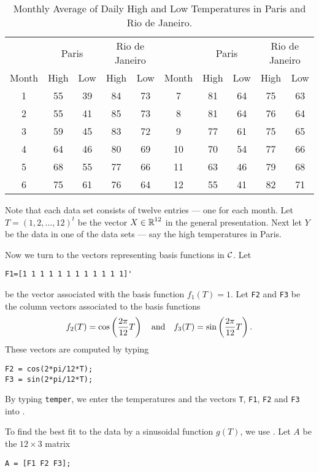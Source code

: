 \documentclass{ximera}
\begin{document}
\begin{table*}[htb]
\begin{center}
\begin{tabular}{|c||c|c||c|c|||c||c|c||c|c|}
\hline
  & \multicolumn{2}{c||}{Paris} & \multicolumn{2}{c|||}{Rio de Janeiro} &
  & \multicolumn{2}{c||}{Paris} & \multicolumn{2}{c|}{Rio de Janeiro}\\
Month & High & Low & High & Low & Month & High & Low & High & Low\\
\hline
  1 & 55 & 39 & 84 & 73 &   7 & 81 & 64 & 75 & 63 \\
  2 & 55 & 41 & 85 & 73 &   8 & 81 & 64 & 76 & 64 \\
  3 & 59 & 45 & 83 & 72 &   9 & 77 & 61 & 75 & 65 \\
  4 & 64 & 46 & 80 & 69 &  10 & 70 & 54 & 77 & 66 \\
  5 & 68 & 55 & 77 & 66 &  11 & 63 & 46 & 79 & 68 \\
  6 & 75 & 61 & 76 & 64 &  12 & 55 & 41 & 82 & 71 \\
\hline
\end{tabular}
\caption{Monthly Average of Daily High and Low Temperatures in Paris and Rio de
Janeiro.}
\label{T:parrio}
\end{center}
\end{table*}

Note that each data set consists of twelve entries --- one for each month.
Let $T=(1,2,\ldots,12)^t$ be the vector $X\in\mbox{$\Bbb{R}$}^{12}$ in the general
presentation.  Next let $Y$ be the data in one of the data sets --- say the
high temperatures in Paris.

Now we turn to the vectors representing basis functions in ${\cal C}$.
Let
\begin{verbatim}
F1=[1 1 1 1 1 1 1 1 1 1 1 1]'
\end{verbatim}
be the vector associated with the basis function $f_1(T)=1$. Let  {\tt F2}
and {\tt F3} be the column vectors associated to the basis functions
\[
f_2(T) = \cos\left(\frac{2\pi}{12} T\right) \quad\mbox{and}\quad
f_3(T) = \sin\left(\frac{2\pi}{12} T\right).
\]
These vectors are computed by typing
\begin{verbatim}
F2 = cos(2*pi/12*T);
F3 = sin(2*pi/12*T);
\end{verbatim}
By typing {\tt temper}, we enter the temperatures and the vectors {\tt T},
{\tt F1},  {\tt F2} and {\tt F3} into \Matlabp.

To find the best fit to the data by a sinusoidal function $g(T)$, we use
.  Let $A$ be the $12\times 3$ matrix
\begin{verbatim}
A = [F1 F2 F3];
\end{verbatim}
\end{document}
